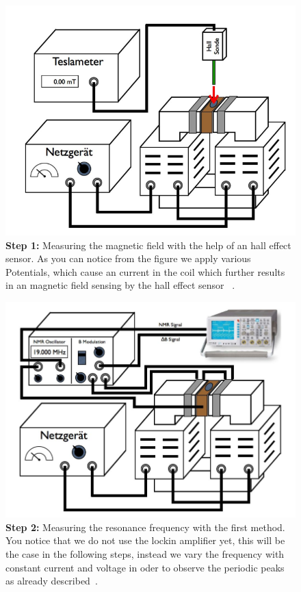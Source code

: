 \begin{figure}[htpb]
    \centering
    \includegraphics[width=0.8\linewidth]{figures/setup1}
    \caption{\textbf{Step 1:} Measuring the magnetic field with the help of 
       an hall effect sensor. As you can notice from the figure we 
      apply various Potentials, which cause an current in the coil which
      further results in an magnetic field sensing by the hall effect sensor
      ~\cite{ver}.}
    \label{fig:figures/setup1}
\end{figure}
\begin{figure}[htpb]
    \centering
    \includegraphics[width=0.8\linewidth]{figures/setup2}
    \caption{\textbf{Step 2:} Measuring the resonance frequency with the first
        method. You notice that we do not use the lockin amplifier yet,
        this will be the case in the following steps, instead we vary the
        frequency with constant current and voltage in oder to observe
        the periodic peaks as already described~\cite{ver}. }
    \label{fig:figures/setup1}
\end{figure}

